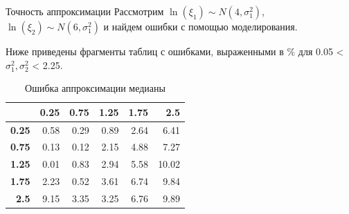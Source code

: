 \documentclass[ucs, notheorems, handout]{beamer}
\begin{document}
\begin{frame}{Точность аппроксимации }
	Рассмотрим $\ln(\xi_{1}) \sim N(4, \sigma _{1}^{2})$, $\ln(\xi_{2}) \sim N(6, \sigma _{1}^{2})$ и найдем ошибки с помощью моделирования.
	
	\bigskip
	
	Ниже приведены фрагменты таблиц с ошибками, выраженными в $\%$ для 0.05 < $\sigma_{1}^{2}, \sigma_{2}^{2}$ < 2.25.
	
	\begin{table}[ht]
		\centering
		\caption{Ошибка аппроксимации медианы  }
		\begin{tabular}{rrrrrr}
			\hline
			& \textbf{0.25} & \textbf{0.75} & \textbf{1.25} & \textbf{1.75} & \textbf{2.5} \\ 
			\hline
			\textbf{0.25} & 0.58 & 0.29 & 0.89 & 2.64 & 6.41 \\ 
			\textbf{0.75} & 0.13 & 0.12 & 2.15 & 4.88 & 7.27 \\ 
			\textbf{1.25} & 0.01 & 0.83 & 2.94 & 5.58 & 10.02 \\ 
			\textbf{1.75} & 2.23 & 0.52 & 3.61 & 6.74 & 9.84 \\ 
			\textbf{2.5} & 9.15 & 3.35 & 3.25 & 6.76 & 9.89 \\ 
			\hline
		\end{tabular}
	\end{table}
	
\end{frame}
\end{document}
